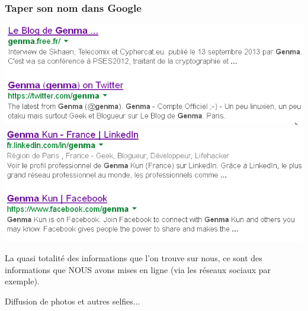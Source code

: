 \documentclass{beamer}
\begin{document}
\begin{frame}
\frametitle{Taper son nom dans Google}
\begin{center}
\includegraphics[scale=0.5] {./images/Google01.png} 
\includegraphics[scale=0.5] {./images/Google02.png} 
\end{center}
\end{frame}
\begin{frame}
\huge{
La quasi totalité des informations que l'on trouve sur nous, ce sont des informations que NOUS avons mises en ligne (via les réseaux sociaux par exemple).}
\end{frame}

\begin{frame}
\begin{center}
\Huge{Diffusion de photos et autres selfies...}
\end{center}
\end{frame}
\end{document}
